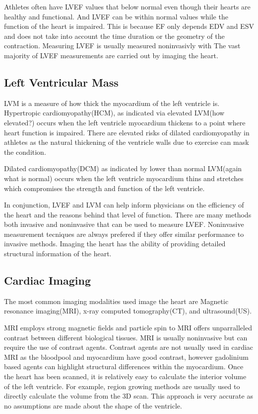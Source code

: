 \documentclass{article}
\begin{document}
Athletes often have LVEF values that below normal even though their hearts are healthy and functional\cite{ef_soa}.
And LVEF can be within normal values while the function of the heart is impaired.
This is because EF only depends EDV and ESV and does not take into account the time duration or the geometry of the contraction.
Measuring LVEF is usually measured noninvasivly with 
The vast majority of LVEF measurements are carried out by imaging the heart.
 \cite{understanding-echo}
%

\subsection{Left Ventricular Mass}
LVM is a measure of how thick the myocardium of the left ventricle is.
Hypertropic cardiomyopathy(HCM), as indicated via elevated LVM(how elevated?) occurs when the left ventricle myocardium thickens to a point where heart function is impaired.
There are elevated risks of dilated cardiomyopathy in athletes as the natural thickening of the ventricle walls due to exercise can mask the condition.

Dilated cardiomyopathy(DCM) as indicated by lower than normal LVM(again what is normal) occurs when the left ventricle myocardium thins and stretches which compromises the strength and function of the left ventricle. 

In conjunction, LVEF and LVM can help inform physicians on the efficiency of the heart and the reasons behind that level of function.
There are many methods both invasive and noninvasive that can be used to measure LVEF.
Noninvasive measurement tecniques are always prefered if they offer similar performance to invasive methods.
Imaging the heart has the ability of providing detailed structural information of the heart.

\subsection{Cardiac Imaging}

The most common imaging modalities used image the heart are Magnetic resonance imaging(MRI), x-ray computed tomography(CT), and ultrasound(US).

MRI employs strong magnetic fields and particle spin to 
MRI offers unparralleled contrast between different biological tissues.
MRI is usually noninvasive but can require the use of contrast agents.
Contrast agents are not usually used in cardiac MRI as the bloodpool and myocardium have good contrast, however gadolinium based agents can highlight structural differences within the myocardium.%
Once the heart has been scanned, it is relatively easy to calculate the interior volume of the left ventricle.
For example, region growing methods are usually used  to directly calculate the volume from the 3D scan.
This approach is very accurate as no assumptions are made about the shape of the ventricle.
\end{document}
